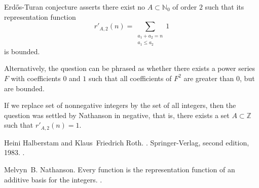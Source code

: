 \documentclass[12pt]{article}
\newcommand*{\naturals}{\mathbb{N}}
\newcommand*{\integers}{\mathbb{Z}}
\begin{document}
Erd\H{o}s-Turan conjecture asserts there exist no  $A\subset \naturals_0$ of order $2$ such that its representation function
\begin{equation*}
r'_{A,2}(n)=\sum_{\substack{a_1+a_2=n\\a_1\leq a_2}} 1
\end{equation*}
is bounded.

Alternatively, the question can be phrased as whether there exists a power series $F$ with coefficients $0$ and $1$ such that all coefficients of $F^2$ are greater than $0$, but are bounded.

If we replace set of nonnegative integers by the set of all integers, then the question was settled by Nathanson\cite{cite:nathanson_everyrepr} in negative, that is, there exists a set $A\subset \integers$ such that $r'_{A,2}(n)=1$.

\begin{thebibliography}{1}

Heini Halberstam and Klaus~Friedrich Roth.
.
\newblock Springer-Verlag, second edition, 1983.
\newblock {}.

Melvyn~B. Nathanson.
\newblock Every function is the representation function of an additive basis
  for the integers.
\newblock {}.

\end{thebibliography}
%
%
\end{document}
